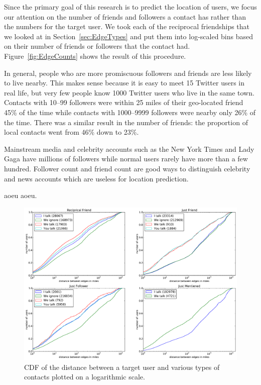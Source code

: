 Since the primary goal of this research is to predict the location of users, we
focus our attention on the number of friends and followers a contact has rather
than the numbers for the target user.
%
We took each of the reciprocal friendships that we looked at in
Section~\ref{sec:EdgeTypes} and put them into log-scaled bins based on their
number of friends or followers that the contact had.
%
Figure~\ref{fig:EdgeCounts} shows the result of this procedure.

In general, people who are more promiscuous followers and friends are less
likely to live nearby.
%
This makes sense because it is easy to meet 15 Twitter users in real life, but
very few people know 1000 Twitter users who live in the same town.
%
Contacts with 10--99 followers were within 25 miles of their geo-located friend
45\% of the time while contacts with 1000--9999 followers were nearby only 26\%
of the time.
%
There was a similar result in the number of friends: the proportion of local
contacts went from 46\% down to 23\%.

Mainstream media and celebrity accounts such as the New York Times and Lady
Gaga have millions of followers while normal users rarely have more than a few
hundred.
%
Follower count and friend count are good ways to distinguish celebrity and news
accounts which are useless for location prediction.

aoeu aoeu.

\ifdefined\THESIS
    \begin{figure}[tbh]
    \centering
    \includegraphics[width=\linewidth]{figures/com_types.pdf}
    \caption{
    CDF of the distance between a target user and various types of contacts
    plotted on a logarithmic scale.
    }
    \label{fig:ComTypes}
    \end{figure}
\fi


